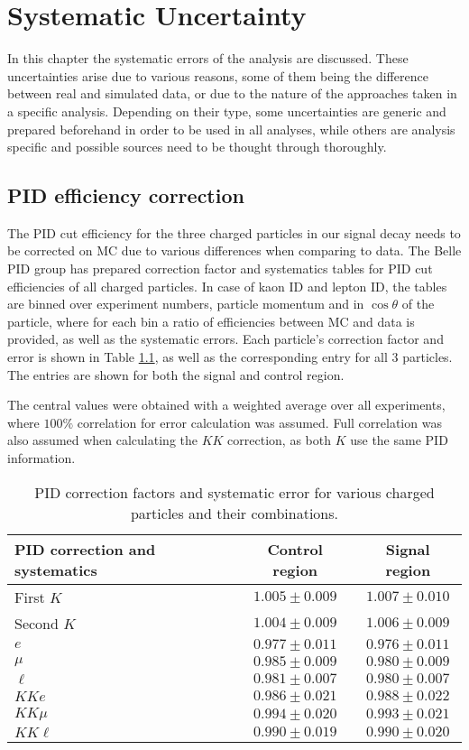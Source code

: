 \chapter{Systematic Uncertainty}
In this chapter the systematic errors of the analysis are discussed. These uncertainties arise due to various reasons, some of them being the difference between real and simulated data, or due to the nature of the approaches taken in a specific analysis. Depending on their type, some uncertainties are generic and prepared beforehand in order to be used in all analyses, while others are analysis specific and possible sources need to be thought through thoroughly. 

\section{PID efficiency correction}

The PID cut efficiency for the three charged particles in our signal decay needs to be corrected on MC due to various differences when comparing to data. The Belle PID group has prepared correction factor and systematics tables for PID cut efficiencies of all charged particles. In case of kaon ID and lepton ID, the tables are binned over experiment numbers, particle momentum and in $\cos\theta$ of the particle, where for each bin a ratio of efficiencies between MC and data is provided, as well as the systematic errors. Each particle's correction factor and error is shown in Table \ref{tab:PID}, as well as the corresponding entry for all 3 particles. The entries are shown for both the signal and control region.

The central values were obtained with a weighted average over all experiments, where $100\%$ correlation for error calculation was assumed. Full correlation was also assumed when calculating the $KK$ correction, as both $K$ use the same PID information.

\begin{table}[H]
	\centering
	\begin{tabular}{|l|c|c|}
		\hline
		PID correction and systematics & Control region & Signal region \\
		\hline
		First $K$ & $1.005\pm 0.009$ & $1.007\pm 0.010$\\
		\hline
		Second $K$ & $1.004\pm 0.009$ & $1.006\pm 0.009$\\
		\hline
		$e$ & $0.977\pm 0.011$ & $0.976\pm 0.011$\\
		\hline
		$\mu$ & $0.985\pm 0.009$ & $0.980\pm 0.009$\\
		\hline
        $\ell$ & $0.981\pm 0.007$ & $0.980\pm 0.007$\\
		\hline
		$KKe$ & $0.986 \pm 0.021$ & $0.988\pm 0.022$\\
		\hline
		$KK\mu$ & $0.994 \pm 0.020$ & $0.993\pm 0.021$\\
		\hline
		$KK\ell$ & $0.990 \pm 0.019$ & $0.990\pm 0.020$\\
		\hline
	\end{tabular}
	\caption{PID correction factors and systematic error for various charged particles and their combinations.}
	\label{tab:PID}
\end{table}

